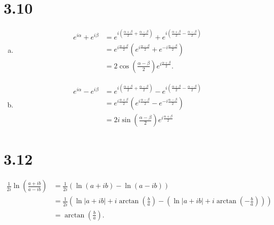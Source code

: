 \documentclass[12pt]{mypackage}
\begin{document}
\section{3.10}%
\begin{enumerate}[(a)]
  \item 
    \begin{align*}
      e^{i\alpha} + e^{i\beta} &= e^{i\left(\frac{\alpha + \beta}{2} + \frac{\alpha - \beta}{2}\right)} + e^{i\left(\frac{\alpha + \beta}{2} - \frac{\alpha - \beta}{2}\right)}\\
                               &= e^{i\frac{\alpha + \beta}{2}}\left(e^{i\frac{\alpha - \beta}{2}} + e^{-i\frac{\alpha - \beta}{2}}\right)\\
                               &= 2\cos\left(\frac{\alpha - \beta}{2}\right)e^{i\frac{\alpha + \beta}{2}}.
    \end{align*}
  \item 
    \begin{align*}
      e^{i\alpha} - e^{i\beta} &= e^{i\left(\frac{\alpha + \beta}{2} + \frac{\alpha - \beta}{2}\right)} - e^{i\left(\frac{\alpha + \beta}{2} - \frac{\alpha - \beta}{2}\right)}\\
                               &=  e^{i\frac{\alpha + \beta}{2}}\left(e^{i\frac{\alpha - \beta}{2}} - e^{-i\frac{\alpha - \beta}{2}}\right)\\
                               &= 2i\sin\left(\frac{\alpha - \beta}{2}\right)e^{i\frac{\alpha + \beta}{2}}
    \end{align*}
\end{enumerate}
\section{3.12}%
\begin{align*}
  \frac{1}{2i}\ln \left(\frac{a + ib}{ a - ib }\right) &= \frac{1}{2i}\left(\ln \left(a + ib\right) - \ln \left(a - ib\right)\right)\\
                                                       &= \frac{1}{2i}\left(\ln |a + ib| + i\arctan\left(\frac{b}{a}\right) - \left(\ln|a + ib| + i\arctan\left(-\frac{b}{a}\right)\right)\right)\\
                                                       &= \arctan\left(\frac{b}{a}\right).
\end{align*}
\end{document}
